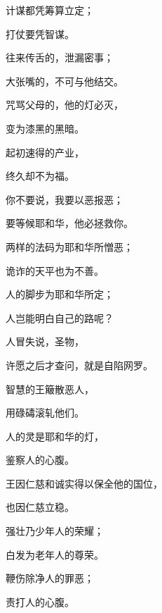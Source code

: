{\par }{\Q {}计谋都凭筹算立定；
\par }{\Q 打仗要凭智谋。
\par }{\Q {}往来传舌的，泄漏密事；
\par }{\Q 大张嘴的，不可与他结交。
\par }{\Q {}咒骂父母的，他的灯必灭，
\par }{\Q 变为漆黑的黑暗。
\par }{\Q {}起初速得的产业，
\par }{\Q 终久却不为福。
\par }{\Q {}你不要说，我要以恶报恶；
\par }{\Q 要等候耶和华，他必拯救你。
\par }{\Q {}两样的法码为耶和华所憎恶；
\par }{\Q 诡诈的天平也为不善。
\par }{\Q {}人的脚步为耶和华所定；
\par }{\Q 人岂能明白自己的路呢？
\par }{\Q {}人冒失说，{}圣物，
\par }{\Q 许愿之后才查问，就是自陷网罗。
\par }{\Q {}智慧的王簸散恶人，
\par }{\Q 用碌碡滚轧他们。
\par }{\Q {}人的灵是耶和华的灯，
\par }{\Q 鉴察人的心腹。
\par }{\Q {}王因仁慈和诚实得以保全他的国位，
\par }{\Q 也因仁慈立稳。
\par }{\Q {}强壮乃少年人的荣耀；
\par }{\Q 白发为老年人的尊荣。
\par }{\Q {}鞭伤除净人的罪恶；
\par }{\Q 责打{}人的心腹。

}
